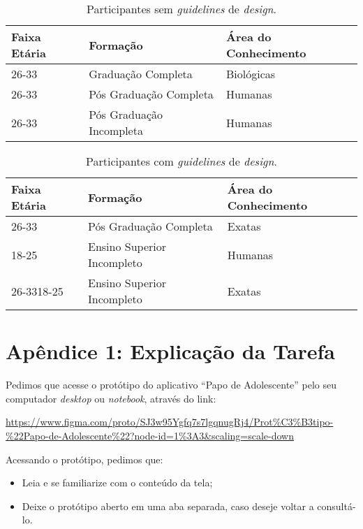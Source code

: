 \documentclass[12pt]{article}
\begin{document}
\begin{table}[!htb]
  \centering
	\begin{tabular}{|l|l|l|}
		\hline
		\textbf{Faixa Etária} & \textbf{Formação} & \textbf{Área do Conhecimento} \\ \hline
		26-33 & Graduação Completa & Biológicas \\ \hline
		26-33 & Pós Graduação Completa & Humanas \\ \hline
		26-33 & Pós Graduação Incompleta & Humanas \\ \hline
		\end{tabular}
  \caption{Participantes sem \textit{guidelines} de \textit{design}.}
  \label{tab:no_guidelines}
\end{table}

\begin{table}[!htb]
  \centering
	\begin{tabular}{|l|l|l|}
		\hline
		\textbf{Faixa Etária} & \textbf{Formação} & \textbf{Área do Conhecimento} \\ \hline
		26-33 & Pós Graduação Completa & Exatas \\ \hline
		18-25 & Ensino Superior Incompleto & Humanas \\ \hline
		26-3318-25 & Ensino Superior Incompleto & Exatas \\ \hline
		\end{tabular}
  \caption{Participantes com \textit{guidelines} de \textit{design}.}
  \label{tab:guidelines}
\end{table}

\section{Apêndice 1: Explicação da Tarefa}
\label{ap:explicacao}

Pedimos que acesse o protótipo do aplicativo ``Papo de Adolescente'' pelo seu computador \textit{desktop} ou \textit{notebook}, através do link:

\url{https://www.figma.com/proto/SJ3w95Ygfq7s7lgqnugRj4/Prot%C3%B3tipo-%22Papo-de-Adolescente%22?node-id=1%3A3&scaling=scale-down}

Acessando o protótipo, pedimos que:

\begin{itemize}
	\item Leia e se familiarize com o conteúdo da tela;
	\item Deixe o protótipo aberto em uma aba separada, caso deseje voltar a consultá-lo.
\end{itemize}
\end{document}
